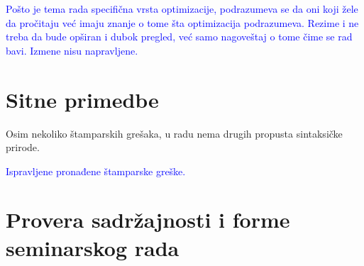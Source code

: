 \documentclass[a4paper]{report}
\newcommand{\odgovor}[1]{\textcolor{blue}{#1}}
\begin{document}
\odgovor{Pošto je tema rada specifična vrsta optimizacije, podrazumeva se da oni koji žele da pročitaju već imaju znanje o tome šta optimizacija podrazumeva. Rezime i ne treba da bude opširan i dubok pregled, već samo nagoveštaj o tome čime se rad bavi. Izmene nisu napravljene.}


\section{Sitne primedbe}
{Osim nekoliko štamparskih grešaka, u radu nema drugih propusta sintaksičke prirode.}

\odgovor{Ispravljene pronađene štamparske greške.}

\section{Provera sadržajnosti i forme seminarskog rada}
\end{document}
